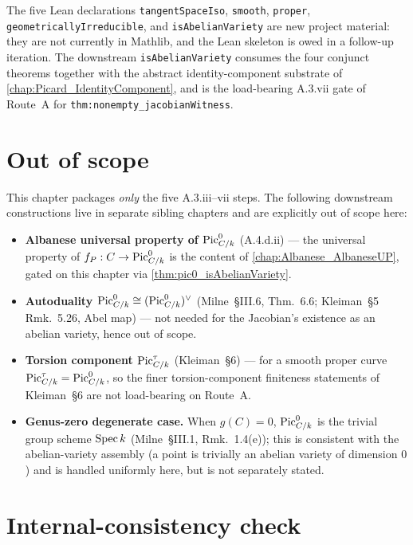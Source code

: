 The five Lean declarations
\texttt{tangentSpaceIso}, \texttt{smooth}, \texttt{proper},
\texttt{geometricallyIrreducible}, and \texttt{isAbelianVariety} are
new project material: they are not currently in Mathlib, and the Lean
skeleton is owed in a follow-up iteration. The downstream
\texttt{isAbelianVariety} consumes the four conjunct theorems together
with the abstract identity-component substrate of
\cref{chap:Picard_IdentityComponent}, and is the load-bearing A.3.vii
gate of Route~A for \texttt{thm:nonempty\_jacobianWitness}.

\section{Out of scope}
\label{sec:pic0_isAbelianVariety_out_of_scope}

This chapter packages \emph{only} the five A.3.iii--vii steps. The
following downstream constructions live in separate sibling chapters
and are explicitly out of scope here:

\begin{itemize}
  \item \textbf{Albanese universal property of \(\operatorname{Pic}^0_{C/k}\)}
    (A.4.d.ii) --- the universal property of \(f_P : C \to \operatorname{Pic}^0_{C/k}\)
    is the content of \cref{chap:Albanese_AlbaneseUP}, gated on this
    chapter via \cref{thm:pic0_isAbelianVariety}.
  \item \textbf{Autoduality \(\operatorname{Pic}^0_{C/k} \cong (\operatorname{Pic}^0_{C/k})^\vee\)}
    (Milne~\S III.6, Thm.~6.6; Kleiman~\S 5 Rmk.~5.26, Abel map) ---
    not needed for the Jacobian's existence as an abelian variety,
    hence out of scope.
  \item \textbf{Torsion component \(\operatorname{Pic}^\tau_{C/k}\)}
    (Kleiman~\S 6) --- for a smooth proper curve
    \(\operatorname{Pic}^\tau_{C/k} = \operatorname{Pic}^0_{C/k}\), so the finer torsion-component
    finiteness statements of Kleiman~\S 6 are not load-bearing on
    Route~A.
  \item \textbf{Genus-zero degenerate case.} When \(g(C) = 0\),
    \(\operatorname{Pic}^0_{C/k}\) is the trivial group scheme \(\operatorname{Spec} k\)
    (Milne~\S III.1, Rmk.~1.4(e)); this is consistent with the
    abelian-variety assembly (a point is trivially an abelian variety
    of dimension \(0\)) and is handled uniformly here, but is not
    separately stated.
\end{itemize}

\section{Internal-consistency check}
\label{sec:pic0_isAbelianVariety_consistency_check}

